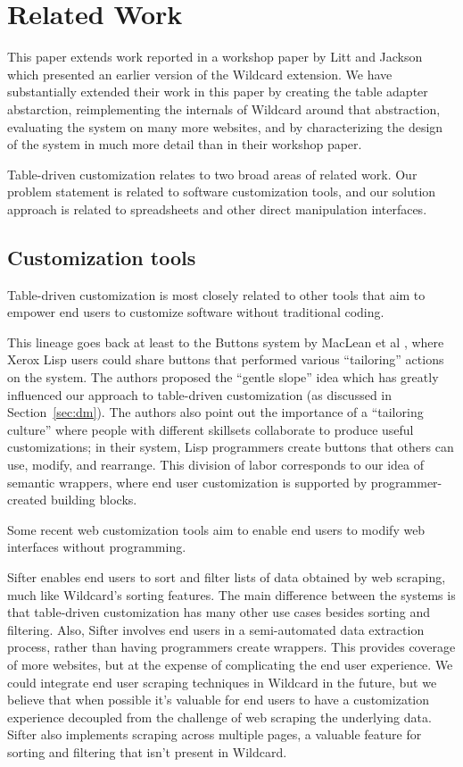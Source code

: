 \documentclass[sigplan,screen,10pt,anonymous,review]{acmart}
\begin{document}
\hypertarget{sec:related-work}{%
\section{Related Work}\label{sec:related-work}}

This paper extends work reported in a workshop paper by Litt and Jackson
\citep{litt2020} which presented an earlier version of the Wildcard
extension. We have substantially extended their work in this paper by
creating the table adapter abstarction, reimplementing the internals of
Wildcard around that abstraction, evaluating the system on many more
websites, and by characterizing the design of the system in much more
detail than in their workshop paper.

Table-driven customization relates to two broad areas of related work.
Our problem statement is related to software customization tools, and
our solution approach is related to spreadsheets and other direct
manipulation interfaces.

\hypertarget{customization-tools}{%
\subsection{Customization tools}\label{customization-tools}}

Table-driven customization is most closely related to other tools that
aim to empower end users to customize software without traditional
coding.

This lineage goes back at least to the Buttons system by MacLean et al
\citep{maclean1990}, where Xerox Lisp users could share buttons that
performed various ``tailoring'' actions on the system. The authors
proposed the ``gentle slope'' idea which has greatly influenced our
approach to table-driven customization (as discussed in
Section~\ref{sec:dm}). The authors also point out the importance of a
``tailoring culture'' where people with different skillsets collaborate
to produce useful customizations; in their system, Lisp programmers
create buttons that others can use, modify, and rearrange. This division
of labor corresponds to our idea of semantic wrappers, where end user
customization is supported by programmer-created building blocks.

Some recent web customization tools aim to enable end users to modify
web interfaces without programming.

Sifter \citep{huynh2006} enables end users to sort and filter lists of
data obtained by web scraping, much like Wildcard's sorting features.
The main difference between the systems is that table-driven
customization has many other use cases besides sorting and filtering.
Also, Sifter involves end users in a semi-automated data extraction
process, rather than having programmers create wrappers. This provides
coverage of more websites, but at the expense of complicating the end
user experience. We could integrate end user scraping techniques in
Wildcard in the future, but we believe that when possible it's valuable
for end users to have a customization experience decoupled from the
challenge of web scraping the underlying data. Sifter also implements
scraping across multiple pages, a valuable feature for sorting and
filtering that isn't present in Wildcard.
\end{document}
